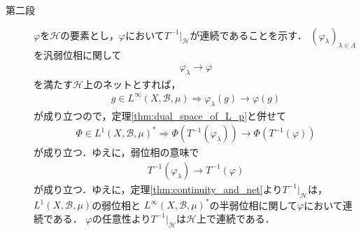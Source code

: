 \begin{description}
		\item[第二段] $\varphi$を$\mathscr{H}$の要素とし，$\varphi$において$T^{-1}|_{\mathscr{H}}$が連続であることを示す．
			$(\varphi_\lambda)_{\lambda \in \Lambda}$を汎弱位相に関して
			\begin{align}
				\varphi_\lambda \longrightarrow \varphi
			\end{align}
			を満たす$\mathscr{H}$上のネットとすれば，
			\begin{align}
				g \in L^\infty(X,\mathcal{B},\mu) \Longrightarrow \varphi_\lambda(g) \longrightarrow \varphi(g)
			\end{align}
			が成り立つので，定理\ref{thm:dual_space_of_L_p}と併せて
			\begin{align}
				\Phi \in L^1(X,\mathcal{B},\mu)^* \Longrightarrow 
				\Phi\left( T^{-1}(\varphi_\lambda) \right) \longrightarrow \Phi\left( T^{-1}(\varphi) \right)
			\end{align}
			が成り立つ．ゆえに，弱位相の意味で
			\begin{align}
				T^{-1}(\varphi_\lambda) \longrightarrow T^{-1}(\varphi)
			\end{align}
			が成り立つ．ゆえに，定理\ref{thm:continuity_and_net}より$T^{-1}|_{\mathscr{H}}$は，$L^1(X,\mathcal{B},\mu)$の弱位相と
			$L^\infty(X,\mathcal{B},\mu)^*$の半弱位相に関して$\varphi$において連続である．
			$\varphi$の任意性より$T^{-1}|_{\mathscr{H}}$は$\mathscr{H}$上で連続である．
			\QED
	\end{description}